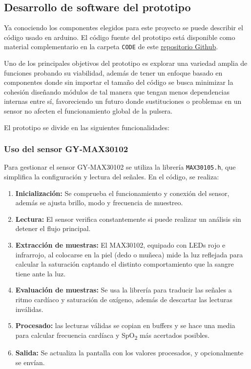 \documentclass[12pt, a4paper]{article}
\begin{document}
	
	\subsection{Desarrollo de software del prototipo}
	
	Ya conociendo los componentes elegidos para este proyecto se puede describir el código usado en arduino. El código fuente del prototipo está disponible como material complementario en la carpeta \texttt{CODE} de este  
	\href{https://github.com/Diegodepab/TFG_Pulsera_Seguimiento_Pacientes_Avanzada_Edad/tree/main/CODE}{repositorio Github}.
	
	Uno de los principales objetivos del prototipo es explorar una variedad amplia de funciones probando su viabilidad, además de tener un enfoque basado en componentes donde sin importar el tamaño del código se busca minimizar la cohesión diseñando módulos de tal manera que tengan menos dependencias internas entre sí, favoreciendo un futuro donde sustituciones o problemas en un sensor no afecten el funcionamiento global de la pulsera.
	
	El prototipo se divide en las siguientes funcionalidades:
	
		\subsubsection{Uso del sensor GY‑MAX30102}
	Para gestionar el sensor GY‑MAX30102 se utiliza la librería \texttt{MAX30105.h}, que simplifica la configuración y lectura del señales. En el código, se realiza:
	
	\begin{enumerate}
		\item \textbf{Inicialización:} Se comprueba el funcionamiento y conexión del sensor, además se ajusta brillo, modo y frecuencia de muestreo.
		\item \textbf{Lectura:} El sensor verifica constantemente si puede realizar un análisis sin detener el flujo principal.
		\item \textbf{Extracción de muestras:} El MAX30102, equipado con LEDs rojo e infrarrojo, al colocarse en la piel (dedo o muñeca) mide la luz reflejada para calcular la saturación captando el distinto comportamiento que la sangre tiene ante la luz.
		\item \textbf{Evaluación de muestras:} Se usa la librería para traducir las señales a ritmo cardíaco y saturación de oxígeno, además de descartar las lecturas inválidas.
		\item \textbf{Procesado:} las lecturas válidas se copian en buffers y se hace una media para calcular frecuencia cardíaca y SpO\textsubscript{2} más acertados posibles.
		\item \textbf{Salida:} Se actualiza la pantalla con los valores procesados, y opcionalmente se envían.
	\end{enumerate}
	
\end{document}
